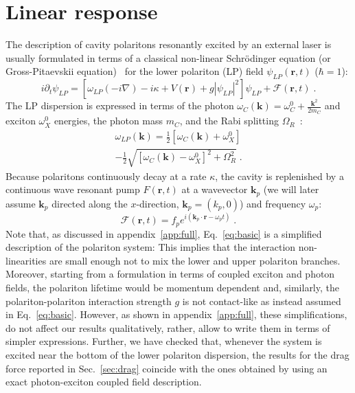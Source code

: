 \section{Linear response}
\label{sec:linea}

The description of cavity polaritons resonantly excited by an external
laser is usually formulated in terms of a classical non-linear
Schr\"odinger equation (or Gross-Pitaevskii equation)~\cite{Ciuti_2003}
for the lower polariton (LP) field $\psi_{LP}(\bm{r}, t)$ ($\hbar =
1$):
%
\begin{equation}
  i \partial_t \psi_{LP} = [\omega_{LP}(-i\nabla) - i\kappa +
    V(\bm{r}) + g |\psi_{LP}|^2]\psi_{LP} + \mathcal{F}(\bm{r},t)\; .
\label{eq:basic}
\end{equation}
%
The LP dispersion is expressed in terms of the photon
$\omega_C(\bm{k}) = \omega_C^0 + \frac{\bm{k}^2}{2m_C}$ and
exciton $\omega_X^0$ energies, the photon mass $m_C$, and the Rabi
splitting $\Omega_R$~\cite{9780199228942}:
%
\begin{multline}
  \omega_{LP}(\bm{k}) = \frac{1}{2} \left[\omega_C(\bm{k}) +
    \omega_X^0\right]\\
%
  - \frac{1}{2} \sqrt{\left[\omega_C(\bm{k}) -
    \omega_X^0 \right]^2 + \Omega_R^2} \; .
\label{eq:dispe}
\end{multline}
%
Because polaritons continuously decay at a rate $\kappa$, the cavity
is replenished by a continuous wave resonant pump $F(\bm{r},t)$ at a
wavevector $\bm{k}_p$ (we will later assume $\bm{k}_p$ directed
along the $x$-direction, $\bm{k}_p = (k_p,0)$) and frequency
$\omega_p$:
\begin{equation}
  \mathcal{F}(\bm{r},t) = f_p e^{i (\bm{k}_p \cdot \bm{r} -
    \omega_p t)} \; .
\end{equation}
%
Note that, as discussed in appendix~\ref{app:full},
Eq.~\eqref{eq:basic} is a simplified description of the polariton
system: This implies that the interaction non-linearities are small
enough not to mix the lower and upper polariton branches. Moreover,
starting from a formulation in terms of coupled exciton and photon
fields, the polariton lifetime would be momentum dependent and,
similarly, the polariton-polariton interaction strength $g$ is not
contact-like as instead assumed in Eq.~\eqref{eq:basic}. However, as
shown in appendix~\ref{app:full}, these simplifications, do not affect
our results qualitatively, rather, allow to write them in terms of
simpler expressions. Further, we have checked that, whenever the
system is excited near the bottom of the lower polariton dispersion,
the results for the drag force reported in Sec.~\ref{sec:drag}
coincide with the ones obtained by using an exact photon-exciton
coupled field description.

